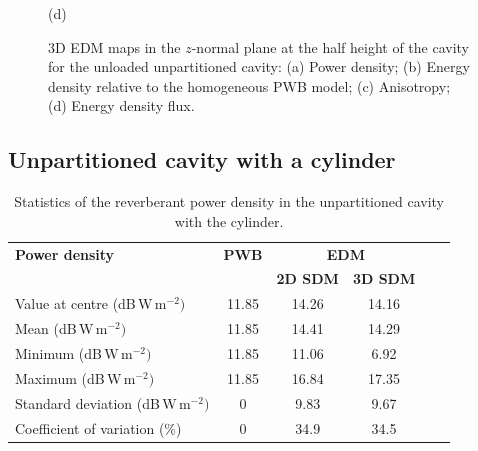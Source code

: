 \documentclass[a4paper]{article}
\numberwithin{equation}{section}
\begin{document}
\begin{figure}[ht]
\begin{center}
{\footnotesize (d)}\\
\vspace{-2mm}
\caption{\label{fg:unpartempty_maps} 3D EDM maps in the $z$-normal plane at the half height of the cavity for the 
unloaded unpartitioned cavity: (a) Power density; (b) Energy density relative to the homogeneous PWB model;
(c) Anisotropy; (d) Energy density flux.}
\end{center}
\end{figure}

\subsection[Unpartitioned cavity with a cylinder]{Unpartitioned cavity with a cylinder}
\label{sc:res:unpartcyl}

\begin{table}[ht]
\begin{center}
\begin{tabular}{|l|c|c|c|c|c|}
\hline
\textbf{Power density}               &\textbf{PWB} &\multicolumn{2}{|c|}{\textbf{EDM}} \\ \cline{3-4}
{}                                   &{}           &\textbf{2D SDM} &\textbf{3D SDM}  \\
\hline
Value at centre (dB\,W\,m$^{-2})$    &11.85        &14.26           &14.16 \\
Mean (dB\,W\,m$^{-2})$               &11.85        &14.41           &14.29 \\
Minimum (dB\,W\,m$^{-2})$            &11.85        &11.06           &6.92  \\
Maximum (dB\,W\,m$^{-2})$            &11.85        &16.84           &17.35 \\
Standard deviation (dB\,W\,m$^{-2})$ &0            &9.83            &9.67  \\
Coefficient of variation (\%)        &0            &34.9            &34.5  \\
\hline
\end{tabular}
\end{center}
\caption{\label{tb:unpartcyl} Statistics of the reverberant power density in the unpartitioned cavity with the cylinder.}
\end{table}
\end{document}
